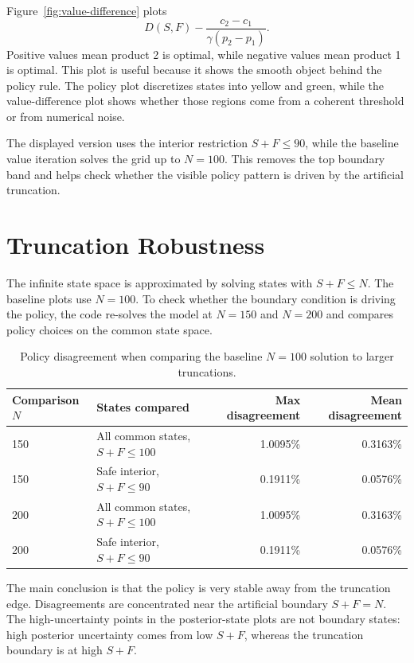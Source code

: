 \documentclass[11pt]{article}
\begin{document}
Figure~\ref{fig:value-difference} plots
\[
    D(S,F)
    -
    \frac{c_2-c_1}{\gamma(p_2-p_1)}.
\]
Positive values mean product 2 is optimal, while negative values mean product 1
is optimal. This plot is useful because it shows the smooth object behind the
policy rule. The policy plot discretizes states into yellow and green, while
the value-difference plot shows whether those regions come from a coherent
threshold or from numerical noise.

The displayed version uses the interior restriction $S+F \le 90$, while the
baseline value iteration solves the grid up to $N=100$. This removes the top
boundary band and helps check whether the visible policy pattern is driven by
the artificial truncation.

\section{Truncation Robustness}

The infinite state space is approximated by solving states with $S+F \le N$.
The baseline plots use $N=100$. To check whether the boundary condition is
driving the policy, the code re-solves the model at $N=150$ and $N=200$ and
compares policy choices on the common state space.

\begin{table}[htbp]
\centering
\caption{Policy disagreement when comparing the baseline $N=100$ solution to larger truncations.}
\label{tab:robustness}
\begin{tabular}{llrr}
\toprule
Comparison $N$ & States compared & Max disagreement & Mean disagreement \\
\midrule
150 & All common states, $S+F \le 100$ & 1.0095\% & 0.3163\% \\
150 & Safe interior, $S+F \le 90$ & 0.1911\% & 0.0576\% \\
200 & All common states, $S+F \le 100$ & 1.0095\% & 0.3163\% \\
200 & Safe interior, $S+F \le 90$ & 0.1911\% & 0.0576\% \\
\bottomrule
\end{tabular}
\end{table}

The main conclusion is that the policy is very stable away from the truncation
edge. Disagreements are concentrated near the artificial boundary $S+F=N$.
The high-uncertainty points in the posterior-state plots are not boundary
states: high posterior uncertainty comes from low $S+F$, whereas the truncation
boundary is at high $S+F$.
\end{document}
